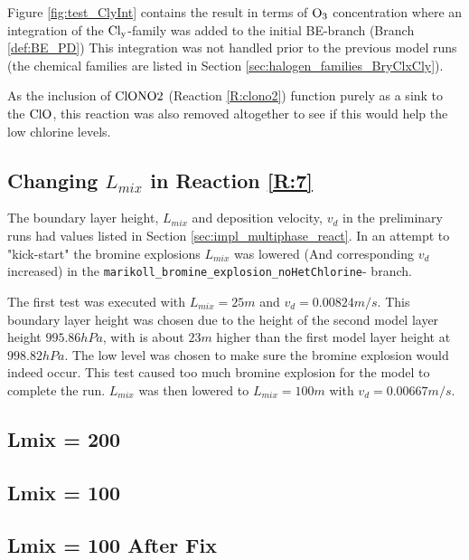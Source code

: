 Figure \ref{fig:test_ClyInt} contains the result in terms of $\mathrm{O_3}$ concentration where an integration of the $\mathrm{Cl_y}$-family was added to the initial BE-branch (Branch \ref{def:BE_PD}) This integration was not handled prior to the previous model runs (the chemical families are listed in Section \ref{sec:halogen_families_BryClxCly}). 

\medskip

As the inclusion of $\mathrm{ClONO2}$ (Reaction \ref{R:clono2}) function purely as a sink to the $\mathrm{ClO}$, this reaction was also removed altogether to see if this would help the low chlorine levels. 



\subsection{Changing $L_{mix}$ in Reaction \ref{R:7}}

The boundary layer height, $L_{mix}$ and deposition velocity, $v_d$ in the preliminary runs had values listed in Section \ref{sec:impl_multiphase_react}. In an attempt to "kick-start" the bromine explosions $L_{mix}$ was lowered (And corresponding $v_d$ increased) in the \texttt{marikoll\_bromine\_explosion\_noHetChlorine}- branch. 

\medskip

The first test was executed with $L_{mix} = 25 m$ and $v_d = 0.00824 m/s$. This boundary layer height was chosen due to the height of the second model layer height $995.86 hPa$, with is about $23 m$ higher than the first model layer height at $998.82 hPa$. The low level was chosen to make sure the bromine explosion would indeed occur. This test caused too much bromine explosion for the model to complete the run. $L_{mix}$ was then lowered to $L_{mix} = 100 m$ with $v_d = 0.00667 m/s$. 

\subsection{Lmix = 200}

\subsection{Lmix = 100}

\subsection{Lmix = 100 After Fix}

